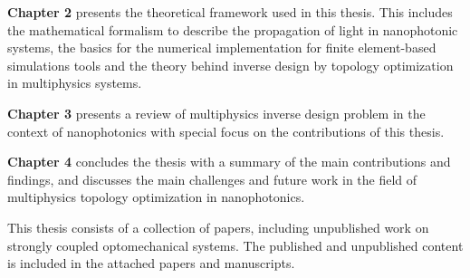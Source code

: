 \textbf{Chapter 2} presents the theoretical framework used in this thesis. This includes the mathematical formalism
to describe the propagation of light in nanophotonic systems, the basics for the numerical implementation for 
finite element-based simulations tools and the theory behind inverse design by topology optimization in multiphysics systems.

\textbf{Chapter 3} presents a review of multiphysics inverse design problem in the context of nanophotonics with special 
focus on the contributions of this thesis.

\textbf{Chapter 4} concludes the thesis with a summary of the main contributions and findings, and discusses the main challenges
and future work in the field of multiphysics topology optimization in nanophotonics.

This thesis consists of a collection of papers, including unpublished work on
strongly coupled optomechanical systems. The published and unpublished content is included in the attached
papers and manuscripts.